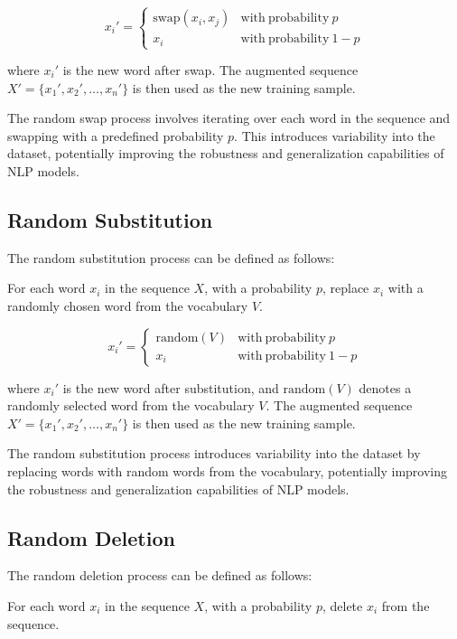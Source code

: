 \documentclass[10pt]{extarticle}
\begin{document}
\[
  x_i' =
  \begin{cases}
    \mathrm{swap}(x_i, x_j) & \mathrm{with\ probability\ } p     \\
    x_i                     & \mathrm{with\ probability\ } 1 - p
  \end{cases}
\]

where \( x_i' \) is the new word after swap. The augmented sequence \( X' =
\{x_1', x_2', \ldots, x_n'\} \) is then used as the new training sample.

The random swap process involves iterating over each word in the sequence and
swapping with a predefined probability \( p \). This introduces variability
into the dataset, potentially improving the robustness and generalization
capabilities of NLP models.

\subsection{Random Substitution}

The random substitution process can be defined as follows:

For each word \( x_i \) in the sequence \( X \), with a probability \( p \),
replace \( x_i \) with a randomly chosen word from the vocabulary \( V \).

\[
  x_i' =
  \begin{cases}
    \mathrm{random}(V) & \mathrm{with\ probability\ } p     \\
    x_i                & \mathrm{with\ probability\ } 1 - p
  \end{cases}
\]

where \( x_i' \) is the new word after substitution, and \( \mathrm{random}(V)
\) denotes a randomly selected word from the vocabulary \( V \). The augmented
sequence \( X' = \{x_1', x_2', \ldots, x_n'\} \) is then used as the new
training sample.

The random substitution process introduces variability into the dataset by
replacing words with random words from the vocabulary, potentially improving
the robustness and generalization capabilities of NLP models.

\subsection{Random Deletion}

The random deletion process can be defined as follows:

For each word \( x_i \) in the sequence \( X \), with a probability \( p \),
delete \( x_i \) from the sequence.
\end{document}
